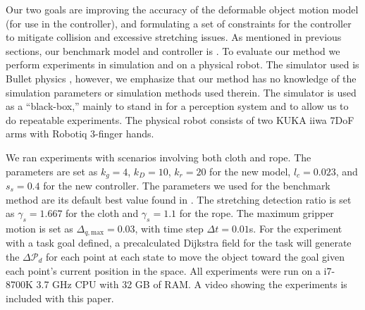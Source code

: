 




Our two goals are improving the accuracy of the deformable object motion model (for use in the controller), 
and formulating a set of constraints for the controller to mitigate collision and excessive stretching issues.
As mentioned in previous sections, our benchmark model and controller is \cite{Berenson2013}. To evaluate our method we perform experiments in simulation and on a physical robot. The simulator used is Bullet physics \cite{Coumans2010}, however, we emphasize that our method has no knowledge of the simulation parameters or simulation methods used therein. The simulator is used as a ``black-box,'' mainly to stand in for a perception system and to allow us to do repeatable experiments. The physical robot consists of two KUKA iiwa 7DoF arms with Robotiq 3-finger hands.






We ran experiments with scenarios involving both cloth and rope.
The parameters are set as $k_g = 4$, $k_D = 10$, $k_{r} = 20$ 
for the new model, $l_c = 0.023$, and $s_s = 0.4$ for the new controller. 
The parameters we used for the benchmark method are its default best value found in \cite{McConachie2018}. The stretching detection ratio is set as $\gamma_s = 1.667$ for the cloth and $\gamma_s = 1.1$ for the rope.
The maximum gripper motion is set as $\Delta_{q,\textrm{max}} = 0.03$, with time step $\Delta t = 0.01$s.
For the experiment with a task goal defined, a precalculated Dijkstra field for the task will generate the $\Delta \mathcal{P}_d$ for each point at each state to move the object toward the goal given each point's current position in the space. All experiments were run on a i7-8700K 3.7 GHz CPU with 32 GB of RAM. A video showing the experiments is included with this paper.

